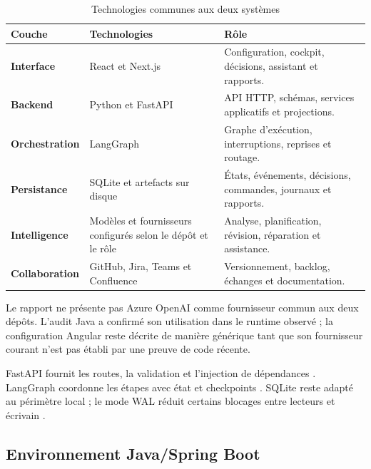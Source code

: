 \begin{table}[H]
    \centering
    \caption{Technologies communes aux deux systèmes}
    \label{tab:technologies-communes-ch4}
    \small
    \begin{tabularx}{\textwidth}{|>{\bfseries\RaggedRight\arraybackslash}p{3.7cm}|>{\RaggedRight\arraybackslash}p{4.3cm}|>{\RaggedRight\arraybackslash}X|}
        \hline
        \rowcolor{cgilight!95}
        \textbf{Couche} & \textbf{Technologies} & \textbf{Rôle} \\
        \hline
        Interface & React et Next.js & Configuration, cockpit, décisions, assistant et rapports. \\
        \hline
        Backend & Python et FastAPI & API HTTP, schémas, services applicatifs et projections. \\
        \hline
        Orchestration & LangGraph & Graphe d'exécution, interruptions, reprises et routage. \\
        \hline
        Persistance & SQLite et artefacts sur disque & États, événements, décisions, commandes, journaux et rapports. \\
        \hline
        Intelligence & Modèles et fournisseurs configurés selon le dépôt et le rôle & Analyse, planification, révision, réparation et assistance. \\
        \hline
        Collaboration & GitHub, Jira, Teams et Confluence & Versionnement, backlog, échanges et documentation. \\
        \hline
    \end{tabularx}
\end{table}

Le rapport ne présente pas Azure OpenAI comme fournisseur commun aux deux dépôts. L'audit Java a confirmé son utilisation dans le runtime observé ; la configuration Angular reste décrite de manière générique tant que son fournisseur courant n'est pas établi par une preuve de code récente.

FastAPI fournit les routes, la validation et l'injection de dépendances \cite{fastapi-dependencies}. LangGraph coordonne les étapes avec état et checkpoints \cite{langgraph-persistence}. SQLite reste adapté au périmètre local ; le mode WAL réduit certains blocages entre lecteurs et écrivain \cite{sqlite-wal}.

\subsection{Environnement Java/Spring Boot}

